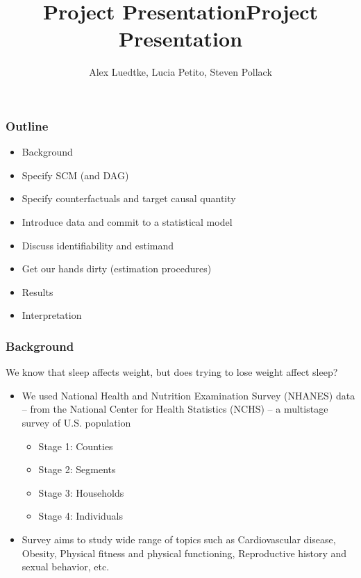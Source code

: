 \documentclass{beamer}
\title[ On the affect of ``attempting to lose weight'' on sleep ]{Project Presentation}
\title[ The effect of ``attempting to lose weight'' on sleep ]{Project Presentation}
\author{Alex Luedtke, Lucia Petito, Steven Pollack}
\institute{PHC252D}
\date{}
\begin{document}
\maketitle 
\begin{frame}
 \frametitle{Outline} %
  \begin{itemize}
    \item Background
    \item Specify SCM (and DAG)
    \item Specify counterfactuals and target causal quantity
    \item Introduce data and commit to a statistical model
    \item Discuss identifiability and estimand
    \item Get our hands dirty (estimation procedures)
    \item Results
    \item Interpretation
  \end{itemize}
\end{frame}

\begin{frame}
 \frametitle{Background}
 We know that sleep affects weight, but does trying to lose weight affect sleep?
 \begin{itemize}
  \item We used National Health and Nutrition Examination Survey (NHANES) data -- from the National Center for Health Statistics (NCHS) -- a multistage survey of U.S. population
    \begin{itemize}
      \item Stage 1: Counties
      \item Stage 2: Segments
      \item Stage 3: Households
      \item Stage 4: Individuals
    \end{itemize}
  \item Survey aims to study wide range of topics such as Cardiovascular disease, Obesity, Physical fitness and physical functioning, Reproductive history and sexual behavior, etc.
  \end{itemize}
\end{frame}
\end{document}
